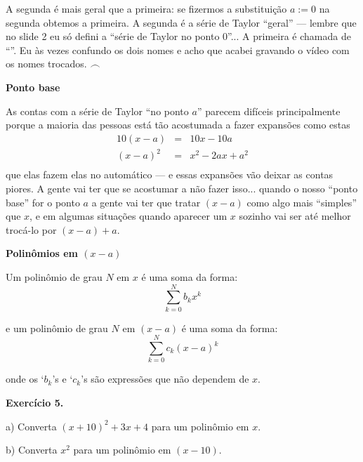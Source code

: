 \documentclass[oneside,12pt]{article}
\begin{document}
A segunda é mais geral que a primeira: se fizermos a substituição
$a:=0$ na segunda obtemos a primeira. A segunda é a série de Taylor
``geral'' --- lembre que no slide 2 eu só defini a ``série de Taylor
no ponto 0''... A primeira é chamada de ``''. Eu às vezes confundo os dois nomes e acho que acabei
gravando o vídeo com os nomes trocados. $\frown$

\newpage


{\bf Ponto base}

As contas com a série de Taylor ``no ponto $a$'' parecem difíceis
principalmente porque a maioria das pessoas está tão acostumada a
fazer expansões como estas
%
$$\begin{array}{rcl}
  10(x-a) &=& 10x - 10a \\
  (x-a)^2 &=& x^2 - 2ax + a^2 \\
  \end{array}
$$
%
que elas fazem elas no automático --- e essas expansões vão deixar as
contas  piores. A gente vai ter que se acostumar a
não fazer isso... quando o nosso ``ponto base'' for o ponto $a$ a
gente vai ter que tratar $(x-a)$ como algo mais ``simples'' que $x$, e
em algumas situações quando aparecer um $x$ sozinho vai ser até melhor
trocá-lo por $(x-a)+a$.

\newpage


{\bf Polinômios em $(x-a)$}

\ssk

Um polinômio de grau $N$ em $x$ é uma soma da forma:
%
$$\sum_{k=0}^{N} b_k x^k$$

e um polinômio de grau $N$ em $(x-a)$ é uma soma da forma:
%
$$\sum_{k=0}^{N} c_k (x-a)^k$$

onde os `$b_k$'s e `$c_k$'s são expressões que não dependem de $x$.

\msk

\newpage


{\bf Exercício 5.}

a) Converta $(x+10)^2 + 3x + 4$ para um polinômio em $x$. 

b) Converta $x^2$ para um polinômio em $(x-10)$.
\end{document}
